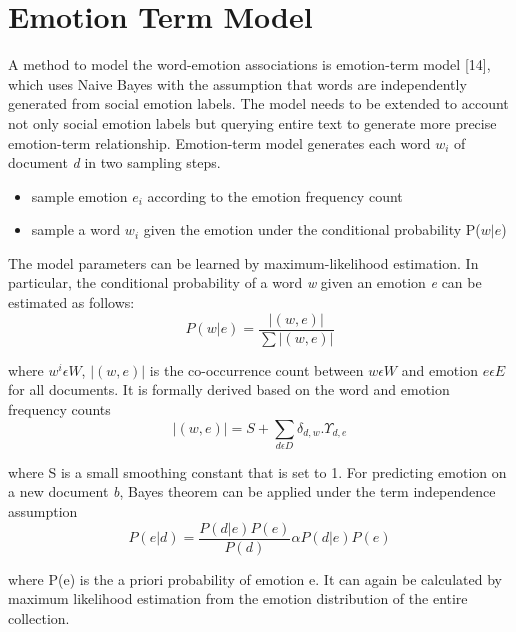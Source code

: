 \documentclass[oneside,a4paper,12pt]{pictreport}
\begin{document}
\section{Emotion Term Model}
A method to model the word-emotion associations is emotion-term model [14], which uses Naive Bayes with the assumption that words are independently generated from social emotion labels. The model needs to be extended to account not only social emotion labels but querying entire text to generate more precise emotion-term relationship. Emotion-term model generates each word \textit{$w_i$} of document \textit{d} in two sampling steps.
\begin{itemize}
\item sample emotion \textit{$e_i$} according to the emotion frequency count
\item sample a word \textit{$w_i$} given the emotion under the conditional probability P($w|e$)
\end{itemize}
\par The model parameters can be learned by maximum-likelihood estimation. In particular, the conditional probability of a word \textit{w} given an emotion \textit{e} can be estimated as follows:
\begin{equation}
P(w|e) = \frac{|(w, e)|}{\sum|(w, e)|} 
\end{equation}
\par where $w^i \epsilon  W$, $|(w, e)|$ is the co-occurrence count between $w \epsilon W$ and emotion $e \epsilon E$ for all documents. It is formally derived based on the word and emotion frequency counts
\begin{equation}
|(w, e)| = S + \sum\limits_{d \epsilon D} \delta_{d,w} . \Upsilon_{d,e}
\end{equation}
\par where S is a small smoothing constant that is set to 1. For predicting emotion on a new document \textit{b}, Bayes theorem can be applied under the term independence assumption
\begin{equation}
P(e|d) = \frac{P(d|e)P(e)}{P(d)} \alpha P(d|e)P(e)
\end{equation}
\par where P(e) is the a priori probability of emotion e. It can again be calculated by maximum likelihood estimation from the emotion distribution of the entire collection.
\end{document}
